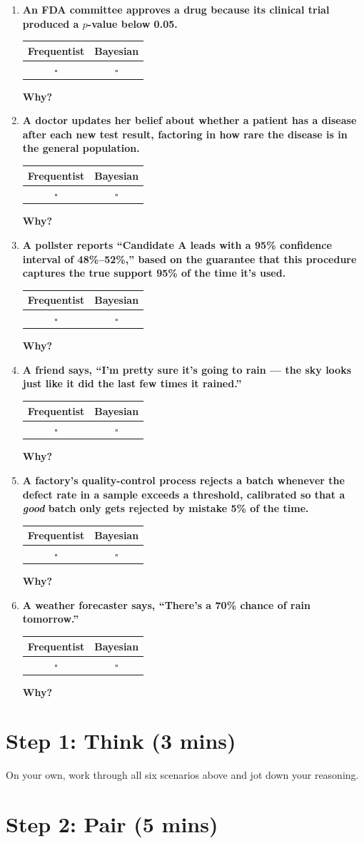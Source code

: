 \documentclass{article}
\newcommand{\classifyrow}[1]{
  \begin{center}
  \renewcommand{\arraystretch}{1.6}
  \begin{tabular}{|c|c|}
  \hline
  \textbf{Frequentist} & \textbf{Bayesian} \\
  \hline
  $\square$ & $\square$ \\
  \hline
  \end{tabular}
  \end{center}
  \textbf{Why?} #1
}
\begin{document}
\begin{enumerate}[leftmargin=*,itemsep=1.1em]

  \item \textbf{An FDA committee approves a drug because its clinical trial produced a $p$-value below 0.05.}
  \classifyrow{}
  \vspace{0.3em}

  \item \textbf{A doctor updates her belief about whether a patient has a disease after each new test result, factoring in how rare the disease is in the general population.}
  \classifyrow{}
  \vspace{0.3em}

  \item \textbf{A pollster reports ``Candidate A leads with a 95\% confidence interval of 48\%--52\%,'' based on the guarantee that this procedure captures the true support 95\% of the time it's used.}
  \classifyrow{}
  \vspace{0.3em}

  \item \textbf{A friend says, ``I'm pretty sure it's going to rain --- the sky looks just like it did the last few times it rained.''}
  \classifyrow{}
  \vspace{0.3em}

  \item \textbf{A factory's quality-control process rejects a batch whenever the defect rate in a sample exceeds a threshold, calibrated so that a \emph{good} batch only gets rejected by mistake 5\% of the time.}
  \classifyrow{}
  \vspace{0.3em}

  \item \textbf{A weather forecaster says, ``There's a 70\% chance of rain tomorrow.''}
  \classifyrow{}

\end{enumerate}

\section*{Step 1: Think (3 mins)}

On your own, work through all six scenarios above and jot down your reasoning.

\section*{Step 2: Pair (5 mins)}
\end{document}
